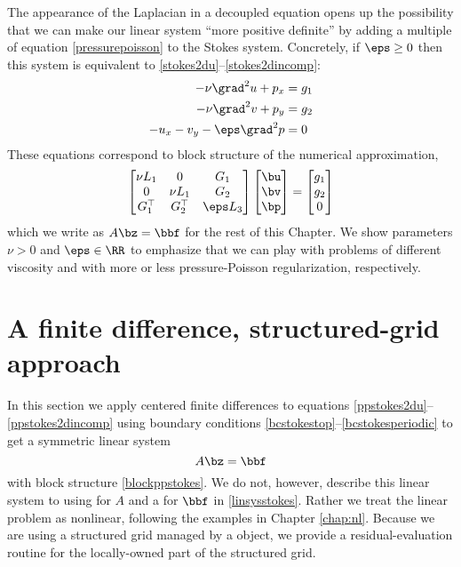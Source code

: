 The appearance of the Laplacian in a decoupled equation opens up the possibility that we can make our linear system ``more positive definite'' by adding a multiple of equation \eqref{pressurepoisson} to the Stokes system.  Concretely, if $\eps\ge 0$ then this system is equivalent to \eqref{stokes2du}--\eqref{stokes2dincomp}:
\begin{align}
-\nu \grad^2 u + p_x &= g_1 \label{ppstokes2du} \\
-\nu \grad^2 v + p_y &= g_2 \label{ppstokes2dv} \\
- u_x - v_y - \eps \grad^2 p &= 0 \label{ppstokes2dincomp}
\end{align}
These equations correspond to block structure of the numerical approximation,
\begin{equation}
\begin{bmatrix}
    \nu L_1 & 0 & G_1 \\
    0 & \nu L_1 & G_2 \\
    G_1^\top & G_2^\top & \eps L_3
    \end{bmatrix}
    \begin{bmatrix}
    \bu \\ \bv \\ \bp
    \end{bmatrix}
    =
    \begin{bmatrix}
    g_1 \\ g_2 \\ 0
    \end{bmatrix} \label{blockppstokes}
\end{equation}
which we write as $A\bz = \bbf$ for the rest of this Chapter.  We show parameters $\nu>0$ and $\eps \in \RR$ to emphasize that we can play with problems of different viscosity and with more or less pressure-Poisson regularization, respectively. 


\section{A finite difference, structured-grid approach}

In this section we apply centered finite differences to equations \eqref{ppstokes2du}--\eqref{ppstokes2dincomp} using boundary conditions \eqref{bcstokestop}--\eqref{bcstokesperiodic} to get a symmetric linear system
\begin{equation}
  A \bz = \bbf \label{linsysstokes}
\end{equation}
with block structure \eqref{blockppstokes}.  We do not, however, describe this linear system to \PETSc using \pMat for $A$ and a \pVec for $\bbf$ in \eqref{linsysstokes}.  Rather we treat the linear problem as nonlinear, following the examples in Chapter \ref{chap:nl}.  Because we are using a structured grid managed by a \PETSc \pDMDA object, we provide a residual-evaluation routine for the locally-owned part of the structured grid.

